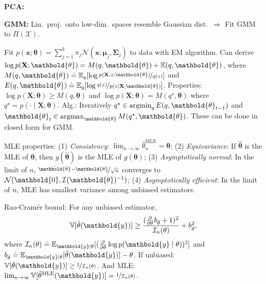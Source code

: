 \documentclass[9pt]{extarticle}
\newenvironment{topic}[1]
{\textbf{\sffamily \colorbox{black}{\rlap{\textbf{\textcolor{white}{#1}}}\hspace{\linewidth}\hspace{-2\fboxsep}}}}
{}
\newenvironment{subtopic}[1]
{\textbf{\sffamily #1:}}
{}
\renewcommand{\mat}[1]{\ensuremath{\mathbf{#1}}}
\renewcommand{\vec}[1]{\ensuremath{\mathbold{#1}}}
\renewcommand{\Var}{\mathbb{V}}
\begin{document}
\begin{multicols*}{3}
\begin{topic}{Anomaly detection}
\begin{subtopic}{PCA}
        \end{subtopic}

        \begin{subtopic}{GMM}
            Lin.\ proj.\ onto low-dim.\ spaces resemble Gaussian dist.\ $\Rightarrow$ Fit
            GMM to $\Pi(\mathcal{X})$.

            Fit $p(\vec{x}; \vec{\theta}) = \sum_{j=1}^{k} \pi_j \mathcal{N}(\vec{x}; \vec{\mu}_j,
                \mat{\Sigma}_j)$ to data with EM algorithm. Can derive $\log p(\mat{X}; \vec{\theta}) = M(q,
                \vec{\theta}) + \E(q, \vec{\theta})$, where $M(q, \vec{\theta}) \doteq \E_q [\log
                    \nicefrac{p(\mat{X},z; \vec{\theta})}{q(z)}]$ and $E(q, \vec{\theta}) \doteq \E_q [\log
                    \nicefrac{q(z)}{p(z \mid \mat{X}; \vec{\theta})}]$. Properties: $\log p(\mat{X}; \vec{\theta}) \geq
                M(q, \vec{\theta})$ and $\log p(\mat{X}; \vec{\theta}) = M(q^\star, \vec{\theta})$ where $q^\star =
                p(\cdot \mid \mat{X}; \vec{\theta})$. Alg.: Iteratively $q^\star \in \argmin_q E(q,
                \vec{\theta}_{t-1})$ and $\vec{\theta}_t \in \argmax_{\vec{\theta}} M(q^\star, \vec{\theta})$.
            These can be done in closed form for GMM.

        \end{subtopic}

    \end{topic}

    \begin{topic}{Density estimation}
        MLE properties: (1) \textit{Consistency}: $\lim_{n\to\infty} \hat{\theta}^{\mathrm{MLE}}_n =
            \vec{\theta}$; (2) \textit{Equivariance}: If $\hat{\vec{\theta}}$ is the MLE of $\vec{\theta}$,
        then $g(\hat{\vec{\theta}})$ is the MLE of $g(\vec{\theta})$; (3) \textit{Asymptotically normal}:
        In the limit of $n$, $\nicefrac{\hat{\vec{\theta}} - \vec{\theta}}{\sqrt{n}}$ converges to
        $\mathcal{N}(\vec{0}, \inv{\mathcal{I}(\vec{\theta})})$; (4) \textit{Asymptotically efficient}: In
        the limit of $n$, MLE has smallest variance among unbiased estimators.

        Rao-Cram\'er bound: For any unbiased estimator, \[
            \Var[\hat{\theta}(\vec{y})] \geq \frac{(\pdv*{b_{\hat{\theta}}}{\theta} + 1)^2}{\mathcal{I}_n(\theta)} + b^2_{\hat{\theta}},
        \]
        where $\mathcal{I}_n(\theta) \doteq \E_{\vec{y} \mid \theta}[(\pdv*{\log p(\vec{y} \mid
                    \theta)}{\theta})^2]$ and $b_{\hat{\theta}} \doteq \E_{\vec{y}\mid \theta}[\hat{\theta}(\vec{y})] -
            \theta$. If unbiased: $\Var[\hat{\theta}(\vec{y})] \geq \nicefrac{1}{\mathcal{I}_n(\theta)}$. And
        MLE: $\lim_{n\to \infty} \Var[\hat{\theta}^{\mathrm{MLE}}(\vec{y})] =
            \nicefrac{1}{\mathcal{I}_n(\theta)}$.
    \end{topic}


\end{multicols*}
\end{document}
